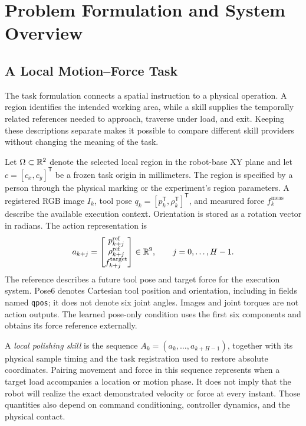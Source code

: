 \chapter{Problem Formulation and System Overview}
\label{chap:faire_overview}

\section{A Local Motion--Force Task}
The task formulation connects a spatial instruction to a physical operation. A region identifies the intended working area, while a skill supplies the temporally related references needed to approach, traverse under load, and exit. Keeping these descriptions separate makes it possible to compare different skill providers without changing the meaning of the task.

Let \(\Omega\subset\mathbb{R}^2\) denote the selected local region in the robot-base XY plane and let \(c=[c_x,c_y]^\mathsf{T}\) be a frozen task origin in millimeters. The region is specified by a person through the physical marking or the experiment's region parameters. A registered RGB image \(I_k\), tool pose \(q_k=[p_k^\mathsf{T},\rho_k^\mathsf{T}]^\mathsf{T}\), and measured force \(f_k^{\mathrm{meas}}\) describe the available execution context. Orientation is stored as a rotation vector in radians. The action representation is
\begin{equation}
 a_{k+j}=\begin{bmatrix}p_{k+j}^{\mathrm{ref}}\\\rho_{k+j}^{\mathrm{ref}}\\f_{k+j}^{\mathrm{target}}\end{bmatrix}\in\mathbb{R}^9,
 \qquad j=0,\ldots,H-1.
 \label{eq:motion_force_prediction}
\end{equation}
The reference describes a future tool pose and target force for the execution system. Pose6 denotes Cartesian tool position and orientation, including in fields named \texttt{qpos}; it does not denote six joint angles. Images and joint torques are not action outputs. The learned pose-only condition uses the first six components and obtains its force reference externally.

A \emph{local polishing skill} is the sequence \(A_k=(a_k,\ldots,a_{k+H-1})\), together with its physical sample timing and the task registration used to restore absolute coordinates. Pairing movement and force in this sequence represents when a target load accompanies a location or motion phase. It does not imply that the robot will realize the exact demonstrated velocity or force at every instant. Those quantities also depend on command conditioning, controller dynamics, and the physical contact.

